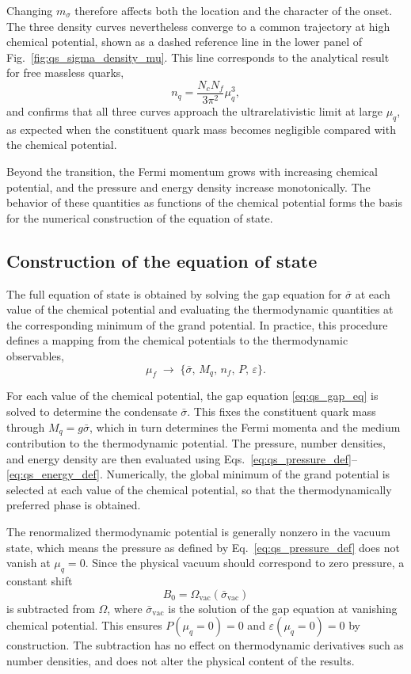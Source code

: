 Changing $m_\sigma$ therefore affects both the location and the
character of the onset. The three density curves nevertheless converge
to a common trajectory at high chemical potential, shown as a dashed
reference line in the lower panel of
Fig.~\ref{fig:qs_sigma_density_mu}. This line corresponds to the
analytical result for free massless quarks,
\begin{equation}
n_q = \frac{N_c N_f}{3\pi^2}\mu_q^3,
\end{equation}
and confirms that all three curves approach the ultrarelativistic
limit at large $\mu_q$, as expected when the constituent quark mass
becomes negligible compared with the chemical potential.

Beyond the transition, the Fermi momentum grows with increasing
chemical potential, and the pressure and energy density increase
monotonically. The behavior of these quantities as functions of the
chemical potential forms the basis for the numerical construction of
the equation of state.

\subsection*{Construction of the equation of state}

The full equation of state is obtained by solving the gap equation for
$\bar{\sigma}$ at each value of the chemical potential and evaluating
the thermodynamic quantities at the corresponding minimum of the grand
potential. In practice, this procedure defines a mapping from the
chemical potentials to the thermodynamic observables,
\begin{equation}
\mu_f \;\longrightarrow\; \{\bar{\sigma},\, M_q,\, n_f,\, P,\, \varepsilon\}.
\end{equation}

For each value of the chemical potential, the gap equation
\eqref{eq:qs_gap_eq} is solved to determine the condensate
$\bar{\sigma}$. This fixes the constituent quark mass through
$M_q = g\bar{\sigma}$, which in turn determines the Fermi momenta and
the medium contribution to the thermodynamic potential. The pressure,
number densities, and energy density are then evaluated using
Eqs.~\eqref{eq:qs_pressure_def}--\eqref{eq:qs_energy_def}. Numerically, the global
minimum of the grand potential is selected at each value of the
chemical potential, so that the thermodynamically preferred phase is
obtained.

The renormalized thermodynamic potential is generally nonzero in the
vacuum state, which means the pressure as defined by
Eq.~\eqref{eq:qs_pressure_def} does not vanish at $\mu_q = 0$.
Since the physical vacuum should correspond to zero pressure, a
constant shift
\begin{equation}
B_0 = \Omega_{\mathrm{vac}}(\bar{\sigma}_{\mathrm{vac}})
\end{equation}
is subtracted from $\Omega$, where $\bar{\sigma}_{\mathrm{vac}}$
is the solution of the gap equation at vanishing chemical potential.
This ensures $P(\mu_q=0) = 0$ and $\varepsilon(\mu_q=0) = 0$ by
construction. The subtraction has no effect on thermodynamic
derivatives such as number densities, and does not alter the physical
content of the results. 

